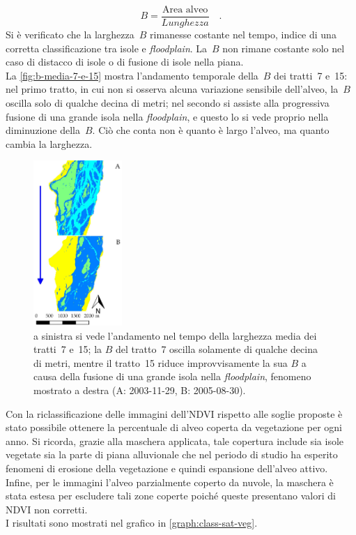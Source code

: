 \begin{description}
	\begin{equation}
		B = \frac{\text{Area alveo}}{Lunghezza} 
		\quad .
		\label{eq:larghezza_tratto}
	\end{equation}
	Si è verificato che la larghezza~$B$ rimanesse costante nel tempo, indice di una corretta classificazione tra isole e \emph{floodplain}. 
	La~$B$ non rimane costante solo nel caso di distacco di isole o di fusione di isole nella piana. 
	\\
	La \vref{fig:b-media-7-e-15} mostra l'andamento temporale della~$B$ dei tratti~7 e~15: nel primo tratto, in cui non si osserva alcuna variazione sensibile dell'alveo, la~$B$ oscilla solo di qualche decina di metri; nel secondo si assiste alla progressiva fusione di una grande isola nella \emph{floodplain}, e questo lo si vede proprio nella diminuzione della~$B$. Ciò che conta non è quanto è largo l'alveo, ma quanto cambia la larghezza.
	\begin{figure}
		\centering
		
		\quad
		\includegraphics[width=0.3\textwidth]{files/fusione_isola_tr_15.jpeg}
		\caption[andamento temporale di $B$ per i tratti~7 e~15]{a sinistra si vede l'andamento nel tempo della larghezza media dei tratti~7 e~15; la $B$ del tratto~7 oscilla solamente di qualche decina di metri, mentre il tratto~15 riduce improvvisamente la sua $B$ a causa della fusione di una grande isola nella \emph{floodplain}, fenomeno mostrato a destra (A: 2003-11-29, B: 2005-08-30).}
		\label{fig:b-media-7-e-15}
	\end{figure}
	
\end{description}


Con la riclassificazione delle immagini dell'NDVI rispetto alle soglie proposte è stato possibile ottenere la percentuale di alveo coperta da vegetazione per ogni anno. 
Si ricorda, grazie alla maschera applicata, tale copertura include sia isole vegetate sia la parte di piana alluvionale che nel periodo di studio ha esperito fenomeni di erosione della vegetazione e quindi espansione dell'alveo attivo.
Infine, per le immagini l'alveo parzialmente coperto da nuvole, la maschera è stata estesa per escludere tali zone coperte poiché queste presentano valori di NDVI non corretti.
\\
I risultati sono mostrati nel grafico in \vref{graph:class-sat-veg}.


